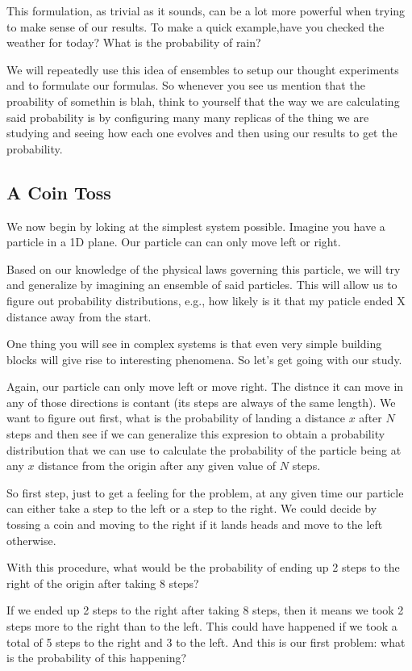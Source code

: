 This formulation, as trivial as it sounds, can be a lot more powerful when trying to make sense of our results.
To make a quick example,have you checked the weather for today? What is the probability of rain?

We will repeatedly use this idea of ensembles to setup our thought experiments and to formulate our formulas.
So whenever you see us mention that the proability of somethin is blah, think to yourself that the way we are calculating said probability is by configuring many many replicas of the thing we are studying and seeing how each one evolves and then using our results to get the probability.

\subsection{A Coin Toss}

We now begin by loking at the simplest system possible.
Imagine you have a particle in a 1D plane.
Our particle can can only move left or right.

Based on our knowledge of the physical laws governing this particle, we will try and generalize by imagining an ensemble of said particles.
This will allow us to figure out probability distributions, e.g., how likely is it that my paticle ended X distance away from the start.

One thing you will see in complex systems is that even very simple building blocks will give rise to interesting phenomena.
So let's get going with our study.

Again, our particle can only move left or move right.
The distnce it can move in any of those directions is contant (its steps are always of the same length).
We want to figure out first, what is the probability of landing a distance $x$ after $N$ steps and then see if we can generalize this expresion to obtain a probability distribution that we can use to calculate the probability of the particle being at any $x$ distance from the origin after any given value of $N$ steps.

So first step, just to get a feeling for the problem, at any given time our particle can either take a step to the left or a step to the right.
We could decide by tossing a coin and moving to the right if it lands heads and move to the left otherwise.

With this procedure, what would be the probability of ending up 2 steps to the right of the origin after taking 8 steps?

If we ended up 2 steps to the right after taking 8 steps, then it means we took 2 steps more to the right than to the left.
This could have happened if we took a total of 5 steps to the right and 3 to the left.
And this is our first problem: what is the probability of this happening?

